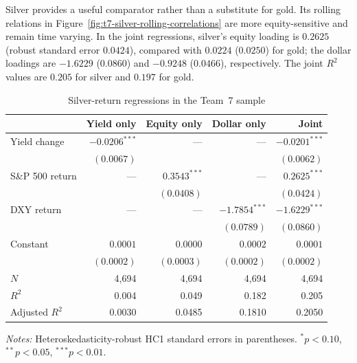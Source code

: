 Silver provides a useful comparator rather than a substitute for gold. Its
rolling relations in Figure~\ref{fig:t7-silver-rolling-correlations} are more
equity-sensitive and remain time varying. In the joint regressions, silver's
equity loading is $0.2625$ (robust standard error $0.0424$), compared with
$0.0224$ ($0.0250$) for gold; the dollar loadings are $-1.6229$ ($0.0860$)
and $-0.9248$ ($0.0466$), respectively. The joint $R^2$ values are $0.205$
for silver and $0.197$ for gold.

\begin{table}[htbp]
\centering
\caption{Silver-return regressions in the Team~7 sample}
\label{tab:t7-silver-ols}
\small
\begin{tabular}{lrrrr}
\toprule
 & Yield only & Equity only & Dollar only & Joint \\
\midrule
Yield change & $-0.0206^{***}$ & --- & --- & $-0.0201^{***}$ \\
             & $(0.0067)$      &     &     & $(0.0062)$       \\
S\&P 500 return & --- & $0.3543^{***}$ & --- & $0.2625^{***}$ \\
                &     & $(0.0408)$     &     & $(0.0424)$       \\
DXY return   & --- & --- & $-1.7854^{***}$ & $-1.6229^{***}$ \\
             &     &     & $(0.0789)$        & $(0.0860)$        \\
Constant     & $0.0001$ & $0.0000$ & $0.0002$ & $0.0001$ \\
             & $(0.0002)$& $(0.0003)$& $(0.0002)$& $(0.0002)$ \\
\midrule
$N$          & 4,694 & 4,694 & 4,694 & 4,694 \\
$R^2$        & 0.004 & 0.049 & 0.182 & 0.205 \\
Adjusted $R^2$ & 0.0030 & 0.0485 & 0.1810 & 0.2050 \\
\bottomrule
\end{tabular}
\begin{minipage}{0.92\textwidth}
\footnotesize\emph{Notes:} Heteroskedasticity-robust HC1 standard errors in
parentheses. $^{*}p<0.10$, $^{**}p<0.05$, $^{***}p<0.01$.
\end{minipage}
\end{table}

